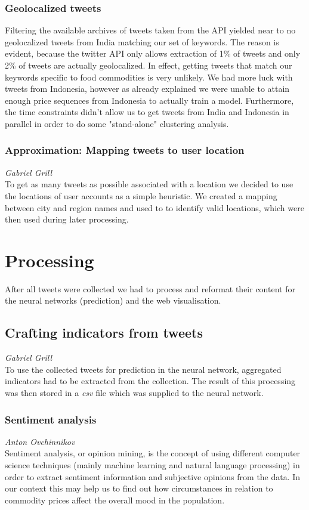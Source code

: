 \subsubsection*{Geolocalized tweets}
Filtering the available archives of tweets taken from the API yielded near to no geolocalized tweets from India matching our set of keywords. The reason is evident, because the twitter API only allows extraction of 1\% of tweets and only 2\% of tweets are actually geolocalized. In effect, getting tweets that match our keywords specific to food commodities is very unlikely. We had more luck with tweets from Indonesia, however as already explained we were unable to attain enough price sequences from Indonesia to actually train a model. Furthermore, the time constraints didn't allow us to get tweets from India and Indonesia in parallel in order to do some "stand-alone" clustering analysis.

\subsubsection*{Approximation: Mapping tweets to user location}
\emph{Gabriel Grill} \\
To get as many tweets as possible associated with a location we decided to use the locations of user accounts as a simple heuristic. We created a mapping between city and region names and used to to identify valid locations, which were then used during later processing.

\section*{Processing}
After all tweets were collected we had to process and reformat their content for the neural networks (prediction) and the web visualisation.

\subsection*{Crafting indicators from tweets}
\emph{Gabriel Grill} \\
To use the collected tweets for prediction in the neural network, aggregated indicators had to be extracted from the collection. The result of this processing was then stored in a \emph{csv} file which was supplied to the neural network.

\subsubsection*{Sentiment analysis}
\emph{Anton Ovchinnikov} \\
Sentiment analysis, or opinion mining, is the concept of using different computer science techniques (mainly machine learning and natural language processing) in order to extract sentiment information and subjective opinions from the data. In our context this may help us to find out how circumstances in relation to commodity prices affect the overall mood in the population.

